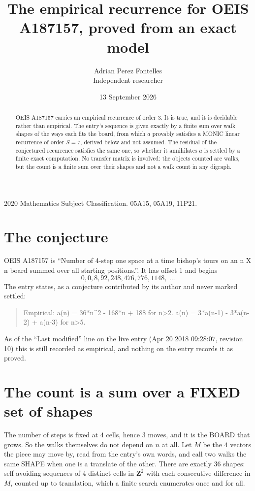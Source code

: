 \documentclass[11pt,a4paper]{article}
\title{The empirical recurrence for OEIS A187157, proved from an exact model}
\author{Adrian Perez Fontelles\\ \small Independent researcher}
\date{13 September 2026}
\theoremstyle{plain}
\theoremstyle{definition}
\begin{document}
\maketitle

\begin{abstract}
OEIS A187157 carries an empirical recurrence of order $3$. It is true, and it is
decidable rather than empirical. The entry's sequence is given exactly by a finite sum over walk shapes of the ways each fits the board, from
which $a$ provably satisfies a MONIC linear recurrence of order $S=7$, derived below and not
assumed. The residual of the conjectured recurrence satisfies the same one, so whether it
annihilates $a$ is settled by a finite exact computation. No transfer matrix is involved: the objects counted are walks, but the count is a finite sum over their shapes and not a walk count in any digraph.
\end{abstract}

\noindent\small 2020 Mathematics Subject Classification. 05A15, 05A19, 11P21.\normalsize

\section{The conjecture}

OEIS A187157 is ``Number of 4-step one space at a time bishop's tours on an n X n board summed over all starting positions.''. It has offset $1$ and begins
\[
0, 0, 8, 92, 248, 476, 776, 1148,\ \dots
\]
The entry states, as a conjecture contributed by its author and never marked settled:
\begin{quote}
Empirical: a(n) = 36*n\^{}2 - 168*n + 188 for n>2. a(n) = 3*a(n-1) - 3*a(n-2) + a(n-3) for n>5.
\end{quote}
As of the ``Last modified'' line on the live entry (Apr 20 2018 09:28:07, revision 10)
this is still recorded as empirical, and nothing on the entry records it as proved.

\section{The count is a sum over a FIXED set of shapes}

The number of steps is fixed at $4$ cells, hence $3$ moves, and it is the BOARD
that grows. So the walks themselves do not depend on $n$ at all. Let $M$ be the $4$
vectors the piece may move by, read from the entry's own words, and call two walks the same
SHAPE when one is a translate of the other. There are exactly $36$ shapes: self-avoiding
sequences of $4$ distinct cells in $\mathbf{Z}^{2}$ with each consecutive difference in
$M$, counted up to translation, which a finite search enumerates once and for all.
\end{document}
